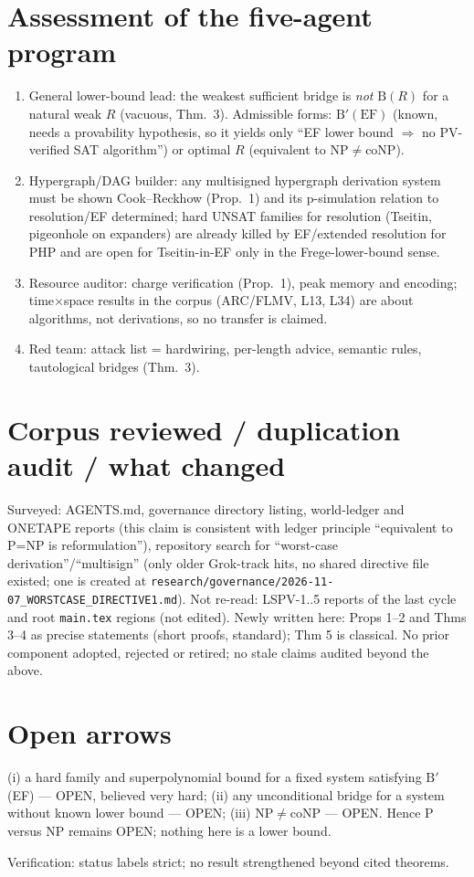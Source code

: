 \documentclass[11pt]{article}
\theoremstyle{remark}
\begin{document}
\section{Assessment of the five-agent program}
\begin{enumerate}
\item General lower-bound lead: the weakest sufficient bridge is \emph{not} $\mathrm B(R)$ for a natural weak $R$ (vacuous, Thm.~3). Admissible forms: $\mathrm B'(\mathrm{EF})$ (known, needs a provability hypothesis, so it yields only ``EF lower bound $\Rightarrow$ no PV-verified SAT algorithm'') or optimal $R$ (equivalent to NP$\neq$coNP).
\item Hypergraph/DAG builder: any multisigned hypergraph derivation system must be shown Cook--Reckhow (Prop.~1) and its p-simulation relation to resolution/EF determined; hard UNSAT families for resolution (Tseitin, pigeonhole on expanders) are already killed by EF/extended resolution for PHP and are open for Tseitin-in-EF only in the Frege-lower-bound sense.
\item Resource auditor: charge verification (Prop.~1), peak memory and encoding; time$\times$space results in the corpus (ARC/FLMV, L13, L34) are about algorithms, not derivations, so no transfer is claimed.
\item Red team: attack list = hardwiring, per-length advice, semantic rules, tautological bridges (Thm.~3).
\end{enumerate}

\section{Corpus reviewed / duplication audit / what changed}
Surveyed: AGENTS.md, governance directory listing, world-ledger and ONETAPE reports (this claim is consistent with ledger principle ``equivalent to P=NP is reformulation''), repository search for ``worst-case derivation''/``multisign'' (only older Grok-track hits, no shared directive file existed; one is created at \texttt{research/governance/2026-11-07\_WORSTCASE\_DIRECTIVE1.md}). Not re-read: LSPV-1..5 reports of the last cycle and root \texttt{main.tex} regions (not edited). Newly written here: Props 1--2 and Thms 3--4 as precise statements (short proofs, standard); Thm 5 is classical. No prior component adopted, rejected or retired; no stale claims audited beyond the above.

\section{Open arrows}
(i) a hard family and superpolynomial bound for a fixed system satisfying $\mathrm B'$ (EF) --- OPEN, believed very hard; (ii) any unconditional bridge for a system without known lower bound --- OPEN; (iii) NP$\neq$coNP --- OPEN. Hence P versus NP remains OPEN; nothing here is a lower bound.

\noindent Verification: status labels strict; no result strengthened beyond cited theorems.
\end{document}
